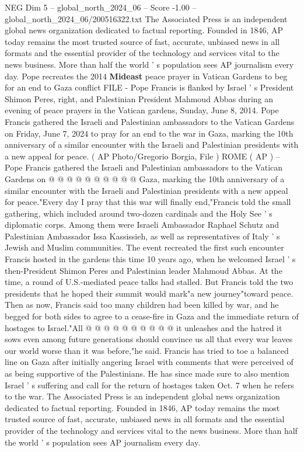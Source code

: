 \begin{textsample}{NEG Dim 5 – global\_north\_2024\_06 – Score -1.00 – global\_north\_2024\_06/200516322.txt}  \label{ex:f5_neg_086}
The Associated Press is an independent global news organization dedicated to factual reporting.
Founded in 1846, AP today remains the most trusted source of fast, accurate, unbiased news in all formats and the essential provider of the technology and services vital to the news business.
More than half the world ' s population sees AP journalism every day.
Pope recreates the 2014 \textbf{Mideast} peace prayer in Vatican Gardens to beg for an end to Gaza conflict FILE - Pope Francis is flanked by Israel ' s President Shimon Peres, right, and Palestinian President Mahmoud Abbas during an evening of peace prayers in the Vatican gardens, Sunday, June 8, 2014.
Pope Francis gathered the Israeli and Palestinian ambassadors to the Vatican Gardens on Friday, June 7, 2024 to pray for an end to the war in Gaza, marking the 10th anniversary of a similar encounter with the Israeli and Palestinian presidents with a new appeal for peace. ( AP Photo/Gregorio Borgia, File ) ROME ( AP ) -- Pope Francis gathered the Israeli and Palestinian ambassadors to the Vatican Gardens on @ @ @ @ @ @ @ @ @ @ Gaza, marking the 10th anniversary of a similar encounter with the Israeli and Palestinian presidents with a new appeal for peace."Every day I pray that this war will finally end,"Francis told the small gathering, which included around two-dozen cardinals and the Holy See ' s diplomatic corps.
Among them were Israeli Ambassador Raphael Schutz and Palestinian Ambassador Issa Kassissieh, as well as representatives of Italy ' s Jewish and Muslim communities.
The event recreated the first such encounter Francis hosted in the gardens this time 10 years ago, when he welcomed Israel ' s then-President Shimon Peres and Palestinian leader Mahmoud Abbas.
At the time, a round of U.S.-mediated peace talks had stalled.
But Francis told the two presidents that he hoped their summit would mark"a new journey"toward peace.
Then as now, Francis said too many children had been killed by war, and he begged for both sides to agree to a cease-fire in Gaza and the immediate return of hostages to Israel."All @ @ @ @ @ @ @ @ @ @ it unleashes and the hatred it sows even among future generations should convince us all that every war leaves our world worse than it was before,"he said.
Francis has tried to toe a balanced line on Gaza after initially angering Israel with comments that were perceived of as being supportive of the Palestinians.
He has since made sure to also mention Israel ' s suffering and call for the return of hostages taken Oct. 7 when he refers to the war.
The Associated Press is an independent global news organization dedicated to factual reporting.
Founded in 1846, AP today remains the most trusted source of fast, accurate, unbiased news in all formats and the essential provider of the technology and services vital to the news business.
More than half the world ' s population sees AP journalism every day.

\end{textsample}
